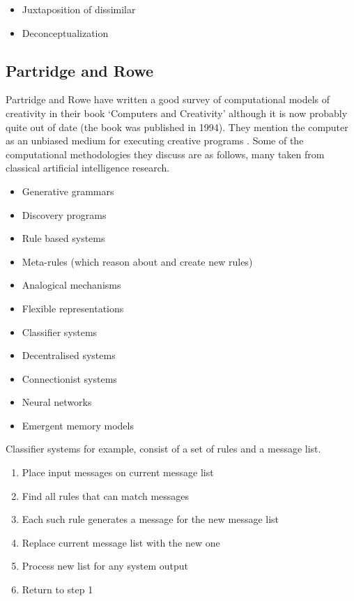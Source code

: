 \begin{itemize}
  \item Juxtaposition of dissimilar
  \item Deconceptualization
\end{itemize}


\subsection*{Partridge and Rowe}

Partridge and Rowe have written a good survey of computational models of creativity in their book `Computers and Creativity' \autocite{Partridge1994} although it is now probably quite out of date (the book was published in 1994). They mention the computer as an unbiased medium for executing creative programs \autocite[p.26]{Partridge1994}. Some of the computational methodologies they discuss are as follows, many taken from classical artificial intelligence research.

\begin{itemize}
  \item Generative  grammars
  \item Discovery programs
  \item Rule based systems
  \item Meta-rules (which reason about and create new rules)
  \item Analogical mechanisms
  \item Flexible representations
  \item Classifier systems
  \item Decentralised systems
  \item Connectionist systems
  \item Neural networks
  \item Emergent memory models
\end{itemize}

Classifier systems for example, consist of a set of rules and a message list.

\begin{enumerate}
  \item Place input messages on current message list
  \item Find all rules that can match messages
  \item Each such rule generates a message for the new message list
  \item Replace current message list with the new one
  \item Process new list for any system output
  \item Return to step 1
\end{enumerate}

